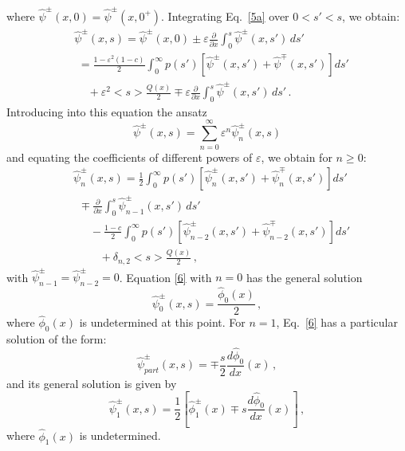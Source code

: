 \documentclass{anstrans}
\newcommand{\bl}{\big<}
\newcommand{\bg}{\big>}
\newcommand{\eps}{\varepsilon}
\begin{document}
where $\hat\psi^\pm(x,0) = \hat\psi^\pm(x,0^+)$. Integrating Eq.\ \eqref{5a} over $0 < s' < s$, we obtain:
   \begin{align}
      &\hat\psi^\pm( x, s)  = \hat\psi^\pm(x, 0) \pm \varepsilon \frac{\partial}{\partial x} \int_0^s \hat\psi^\pm(x, s') \, ds' \nonumber\\
      & \,\, = \frac{1-\eps^2(1-c)}{2} \int_0^{\infty} p(s')
\left[\hat\psi^\pm(x,s')+\hat\psi^\mp(x, s')\right] ds'  \nonumber\\
         &\,\,\,\,\,\,\, + \varepsilon^2 \bl s\bg \frac{Q(x)}{2} \mp \varepsilon\frac{\partial}{\partial x} \int_0^s \hat\psi^\pm(x, s') \, ds' \,.\nonumber
   \end{align}
Introducing into this equation the ansatz 
   \begin{equation}
 \hat\psi^\pm(x, s) =  \sum_{n=0}^{\infty} \varepsilon^n
       \hat\psi_n^\pm(x, s) \nonumber
       \end{equation}
and equating the coefficients of different powers of $\varepsilon$, we obtain for $n \ge 0$:
   \begin{align}
&      \hat\psi_n^\pm(x, s)  = \frac{1}{2}\int_0^{\infty} p(s')\left[
\hat\psi_n^\pm(x, s')+\hat\psi_n^\mp(x,s')\right] ds' \label{6}\\
&\,\,\, \mp \frac{\partial}{\partial x} \int_0^s \hat\psi_{n-1}^\pm(x, s') \, ds' \nonumber \\
& \,\,\,\,\,\,\,\,\, -\frac{1-c}{2}\int_0^{\infty} p(s')\left[
\hat\psi_{n-2}^\pm(x, s')+\hat\psi_{n-2}^\mp(x,s')\right] ds'  \nonumber\\   
      & \,\,\,\,\,\,\,\,\,\,\,\,\,\,+ \delta_{n,2} \bl s\bg \frac{Q( x)}{2} \,, 
   \nonumber
   \end{align}
with $\hat\psi_{n-1}^\pm=\hat\psi_{n-2}^\pm=0$. Equation \eqref{6} with $n=0$ has the general solution
   \begin{equation}
      \hat\psi_0^\pm(x, s) = \frac{\hat\phi_0(x)}{2} \,, \nonumber
   \end{equation}
where $\hat\phi_0(x)$ is undetermined at this point. For $n=1$,
Eq.\ \eqref{6} has a particular solution of the form:
    \begin{equation}
      \hat\psi_{part}^\pm(x,s) = \mp \frac{s}{2}\frac{d \hat\phi_0}{d x}(x) \,,\nonumber
   \end{equation}   
and its general solution is given by 
   \begin{equation}
      \hat\psi_1^\pm( x, s) =  \frac{1}{2}\left[\hat\phi_1^\pm( x) \mp s\frac{d \hat\phi_0}{d x}(x)\right] \,,\nonumber
   \label{eq17}
  \end{equation}  
where $\hat\phi_1(x)$ is undetermined.
\end{document}
